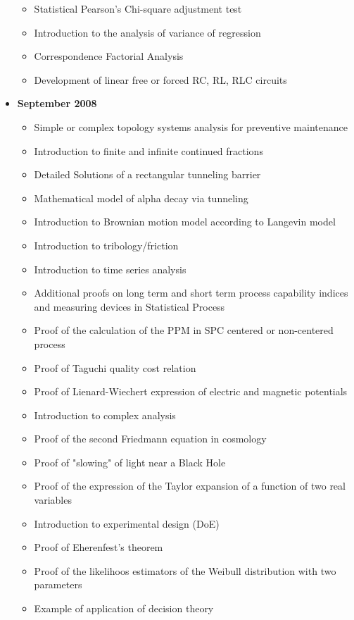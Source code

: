\documentclass[12pt,a4paper,twoside,openright]{report}
\theoremstyle{definition}
\theoremstyle{itexmp}
\numberwithin{equation}{section}
\begin{document}
\begin{itemize}
\begin{itemize}[noitemsep]
				\item Statistical Pearson's Chi-square adjustment test  
				\item Introduction to the analysis of variance of regression
				\item Correspondence Factorial Analysis
				\item Development of linear free or forced RC, RL, RLC circuits
			\end{itemize}
		\item \textbf{September 2008}
			\begin{itemize}[noitemsep]
				\item Simple or complex topology systems analysis for preventive maintenance
				\item Introduction to finite and infinite continued fractions
				\item Detailed Solutions of a rectangular tunneling barrier
				\item Mathematical model of alpha decay via tunneling
				\item Introduction to Brownian motion model according to Langevin model
				\item Introduction to tribology/friction
				\item Introduction to time series analysis
				\item Additional proofs on long term and short term process capability indices and measuring devices in Statistical Process
				\item Proof of the calculation of the PPM in SPC centered or non-centered process
				\item Proof of Taguchi quality cost relation
				\item Proof of Lienard-Wiechert expression of electric and magnetic potentials 
				\item Introduction to complex analysis
				\item Proof of the second Friedmann equation in cosmology
				\item Proof of "slowing" of light near a Black Hole
				\item Proof of the expression of the Taylor expansion of a function of two real variables
				\item Introduction to experimental design (DoE)
				\item Proof of Eherenfest's theorem
				\item Proof of the likelihoos estimators of the Weibull distribution with two parameters
				\item Example of application of decision theory

\end{itemize}
\end{itemize}
\end{document}
